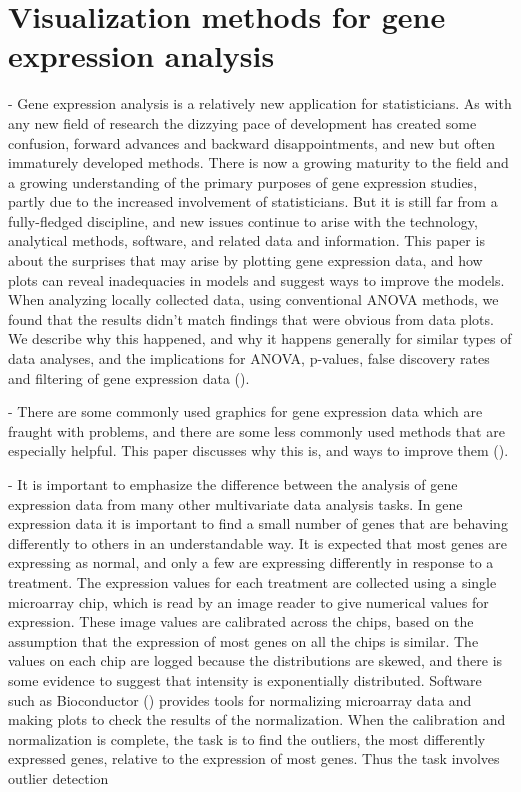 \documentclass[11pt,a4paper,oldfontcommands,openany]{memoir}
\numberwithin{equation}{section} %
\begin{document}
\chapter{Visualization methods for gene expression analysis}

- Gene expression analysis is a relatively new application for statisticians. As with any new field of research the dizzying pace of development has created some confusion, forward advances and backward disappointments, and new but often immaturely developed methods. There is now a growing maturity to the field and a growing understanding of the primary purposes of gene expression studies, partly due to the increased involvement of statisticians. But it is still far from a fully-fledged discipline, and new issues continue to arise with the technology, analytical methods, software, and related data and information. This paper is about the surprises that may arise by plotting gene expression data, and how plots can reveal inadequacies in models and suggest ways to improve the models. When analyzing locally collected data, using conventional ANOVA methods, we found that the results didn’t match findings that were obvious from data plots. We describe why this happened, and why it happens generally for similar types of data analyses, and the implications for ANOVA, p-values, false discovery rates and filtering of gene expression data (\citealt{jds}).

- There are some commonly used graphics for gene expression data which are fraught with problems, and there are some less commonly used methods that are especially helpful. This paper discusses why this is, and ways to improve them (\citealt{jds}).

- It is important to emphasize the difference between the analysis of gene expression data from many other multivariate data analysis tasks. In gene expression data it is important to find a small number of genes that are behaving differently to others in an understandable way. It is expected that most genes are expressing as normal, and only a few are expressing differently in response to a treatment. The expression values for each treatment are collected using a single microarray chip, which is read by an image reader to give numerical values for expression. These image values are calibrated across the chips, based on the assumption that the expression of most genes on all the chips is similar. The values on each chip are logged because the distributions are skewed, and there is some evidence to suggest that intensity is exponentially distributed. Software such as Bioconductor (\citealt{bioconductor}) provides tools for normalizing microarray data and making plots to check the results of the normalization. When the calibration and normalization is complete, the task is to find the outliers, the most differently expressed genes, relative to the expression of most genes. Thus the task involves outlier detection 
\end{document}
